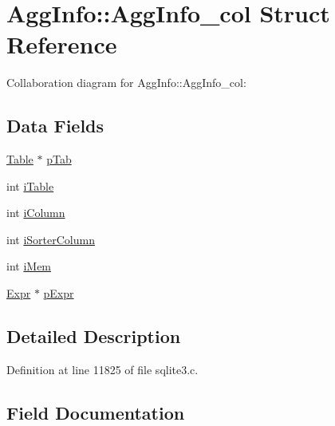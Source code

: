 \hypertarget{struct_agg_info_1_1_agg_info__col}{}\section{Agg\+Info\+:\+:Agg\+Info\+\_\+col Struct Reference}
\label{struct_agg_info_1_1_agg_info__col}


Collaboration diagram for Agg\+Info\+:\+:Agg\+Info\+\_\+col\+:
\subsection*{Data Fields}
\begin{DoxyCompactItemize}
\item 
\hyperlink{struct_table}{Table} $\ast$ \hyperlink{struct_agg_info_1_1_agg_info__col_a11b1abc167f386db2ab7fc634c880c26}{p\+Tab}
\item 
int \hyperlink{struct_agg_info_1_1_agg_info__col_a3d7171e8cbf2d9cc6743da9da42c8828}{i\+Table}
\item 
int \hyperlink{struct_agg_info_1_1_agg_info__col_a64afc1df38f1cd02b956e9dd963c0b97}{i\+Column}
\item 
int \hyperlink{struct_agg_info_1_1_agg_info__col_a66f2ac8829529080fcc814d135649ca0}{i\+Sorter\+Column}
\item 
int \hyperlink{struct_agg_info_1_1_agg_info__col_a4148ebd0b3725e0aab563fee5e1c4082}{i\+Mem}
\item 
\hyperlink{struct_expr}{Expr} $\ast$ \hyperlink{struct_agg_info_1_1_agg_info__col_aab4193f0accd02e4c2e5e60e105c03ca}{p\+Expr}
\end{DoxyCompactItemize}


\subsection{Detailed Description}


Definition at line 11825 of file sqlite3.\+c.



\subsection{Field Documentation}
\hypertarget{struct_agg_info_1_1_agg_info__col_a64afc1df38f1cd02b956e9dd963c0b97}{}
